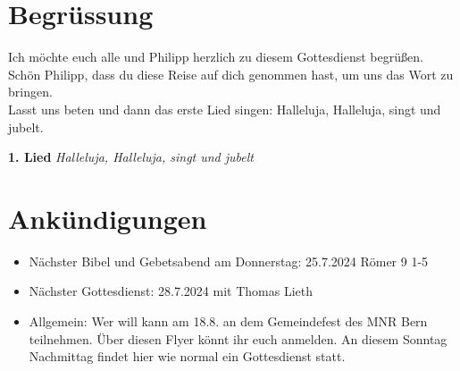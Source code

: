 
\section{Begrüssung}
Ich möchte euch alle und Philipp herzlich zu diesem Gottesdienst begrüßen. Schön Philipp, dass du diese Reise auf dich genommen hast, um uns das Wort zu bringen. \\Lasst uns beten und dann das erste Lied singen: Halleluja, Halleluja, singt und jubelt.

\textbf{1. Lied}
\textit{Halleluja, Halleluja, singt und jubelt}

\section{Ankündigungen}
\begin{itemize}
    \item Nächster Bibel und Gebetsabend am Donnerstag: 25.7.2024 Römer 9 1-5
    \item Nächster Gottesdienst: 28.7.2024 mit Thomas Lieth
    \item Allgemein: Wer will kann am 18.8. an dem Gemeindefest des MNR Bern teilnehmen. Über diesen Flyer könnt ihr euch anmelden. An diesem Sonntag Nachmittag findet hier wie normal ein Gottesdienst statt.
\end{itemize}

